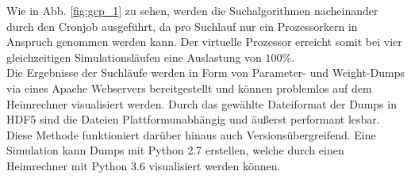 		Wie in Abb. \ref{fig:gcp_1} zu sehen, werden die Suchalgorithmen nacheinander durch den Cronjob ausgeführt, da pro Suchlauf nur ein Prozessorkern in Anspruch genommen werden kann. Der virtuelle Prozessor erreicht somit bei vier gleichzeitigen Simulationsläufen eine Auslastung von $100\%$.\\
		Die Ergebnisse der Suchläufe werden in Form von Parameter- und Weight-Dumps via eines Apache Webservers bereitgestellt und können problemlos auf dem Heimrechner visualisiert werden. Durch das gewählte Dateiformat der Dumps in HDF5 sind die Dateien Plattformunabhängig und äußerst performant lesbar. Diese Methode funktioniert darüber hinaus auch Versionsübergreifend. Eine Simulation kann Dumps mit Python 2.7 erstellen, welche durch einen Heimrechner mit Python 3.6 visualisiert werden können.

